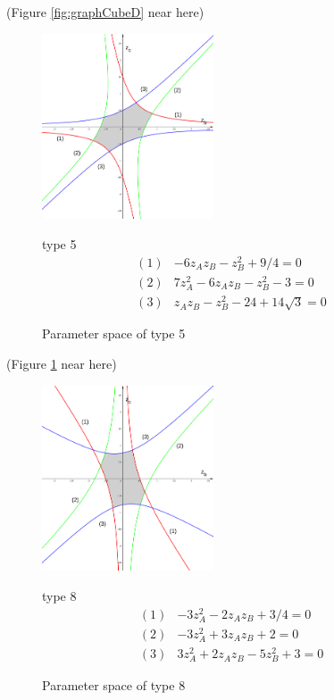 \documentclass[suppldata, dvipdfmx]{interact}
\theoremstyle{plain}%
\theoremstyle{definition}
\theoremstyle{remark}
\theoremstyle{problemstyle}
\begin{document}
\noindent(Figure \ref{fig:graphCubeD} near here)

\begin{figure}[h!tbp]
 \begin{minipage}[]{0.5\textwidth}
 \centering
 \includegraphics[width=2in,
 keepaspectratio]{./img/graph/cubeE.jpg}
 \caption{Parameter space of type 5}
 \label{fig:graphCubeE}
 \end{minipage}
 \hspace*{\fill}
 \begin{minipage}[]{0.5\textwidth}
  \centering
  type 5
  \begin{align*}
   (1)& -6z_Az_B - z_B^2 + 9/4 = 0\\
   (2)& 7z_A^2 - 6z_Az_B - z_B^2 - 3 = 0\\
   (3)& z_Az_B - z_B^2 - 24 + 14\sqrt{3} = 0
  \end{align*}
 \end{minipage}
 \hspace*{\fill}
\end{figure}

\noindent(Figure \ref{fig:graphCubeE} near here)

\begin{figure}[h!tbp]
 \begin{minipage}[]{0.5\textwidth}
 \centering
 \includegraphics[width=2in,
 keepaspectratio]{./img/graph/cubeH.jpg}
 \caption{Parameter space of type 8}
 \label{fig:graphCubeH}
 \end{minipage}
 \hspace*{\fill}
 \begin{minipage}[]{0.5\textwidth}
  \centering
  type 8
  \begin{align*}
   (1)& -3z_A^2 - 2z_Az_B + 3/4 = 0\\
   (2)& -3z_A^2 + 3 z_Az_B + 2 = 0\\
   (3)&  3z_A^2 + 2z_Az_B -5z_B^2 + 3 = 0
  \end{align*}
 \end{minipage}
 \hspace*{\fill}
\end{figure}
\end{document}
